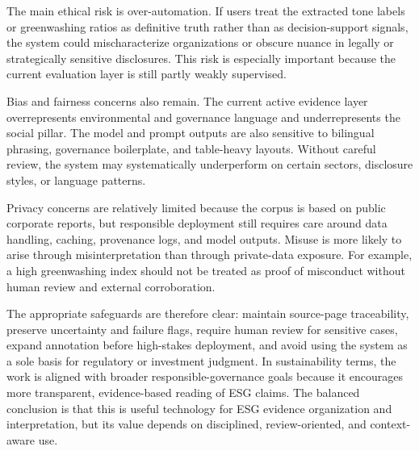 The main ethical risk is over-automation. If users treat the extracted tone labels or greenwashing ratios as definitive truth rather than as decision-support signals, the system could mischaracterize organizations or obscure nuance in legally or strategically sensitive disclosures. This risk is especially important because the current evaluation layer is still partly weakly supervised.

Bias and fairness concerns also remain. The current active evidence layer overrepresents environmental and governance language and underrepresents the social pillar. The model and prompt outputs are also sensitive to bilingual phrasing, governance boilerplate, and table-heavy layouts. Without careful review, the system may systematically underperform on certain sectors, disclosure styles, or language patterns.

Privacy concerns are relatively limited because the corpus is based on public corporate reports, but responsible deployment still requires care around data handling, caching, provenance logs, and model outputs. Misuse is more likely to arise through misinterpretation than through private-data exposure. For example, a high greenwashing index should not be treated as proof of misconduct without human review and external corroboration.

The appropriate safeguards are therefore clear: maintain source-page traceability, preserve uncertainty and failure flags, require human review for sensitive cases, expand annotation before high-stakes deployment, and avoid using the system as a sole basis for regulatory or investment judgment. In sustainability terms, the work is aligned with broader responsible-governance goals because it encourages more transparent, evidence-based reading of ESG claims. The balanced conclusion is that this is useful technology for ESG evidence organization and interpretation, but its value depends on disciplined, review-oriented, and context-aware use.